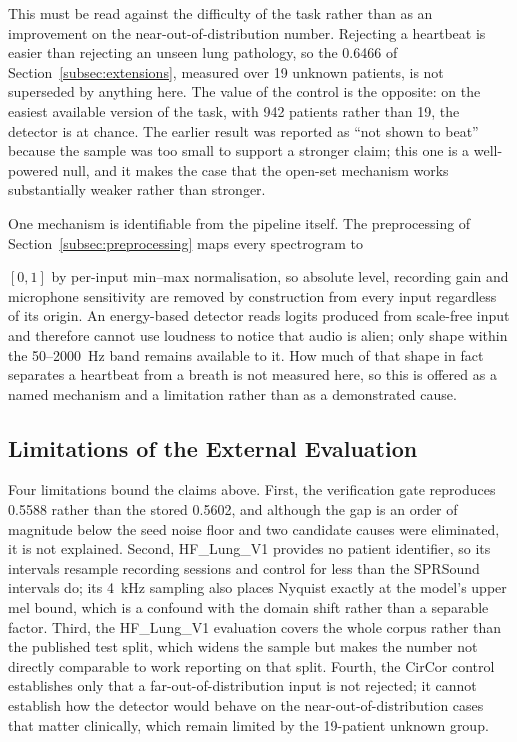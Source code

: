 \documentclass[journal,onecolumn]{IEEEtran}
\newif\ifshownew
\newcommand{\added}[1]{\ifshownew\ul{#1}\else#1\fi}
\newenvironment{addedblock}{}{}
\begin{document}
\begin{addedblock}
\added{%
This must be read against the difficulty of the task rather than as an improvement on the
near-out-of-distribution number. Rejecting a heartbeat is easier than rejecting an unseen lung
pathology, so the 0.6466 of Section~\mbox{\ref{subsec:extensions}}, measured over 19 unknown patients,
is not superseded by anything here. The value of the control is the opposite: on the easiest
available version of the task, with 942 patients rather than 19, the detector is at chance. The
earlier result was reported as ``not shown to beat'' because the sample was too small to
support a stronger claim; this one is a well-powered null, and it makes the case that the
open-set mechanism works substantially weaker rather than stronger.%
}

\added{%
One mechanism is identifiable from the pipeline itself. The preprocessing of
Section~\mbox{\ref{subsec:preprocessing}} maps every spectrogram to%
}
$[0,1]$
\added{%
by per-input min--max normalisation, so absolute level, recording gain and microphone
sensitivity are removed by construction from every input regardless of its origin. An
energy-based detector reads logits produced from scale-free input and therefore cannot use
loudness to notice that audio is alien; only shape within the 50--2000~Hz band remains
available to it. How much of that shape in fact separates a heartbeat from a breath is not
measured here, so this is offered as a named mechanism and a limitation rather than as a
demonstrated cause.%
}

\subsection{Limitations of the External Evaluation}
\label{subsec:extlimits}

\added{%
Four limitations bound the claims above. First, the verification gate reproduces 0.5588 rather
than the stored 0.5602, and although the gap is an order of magnitude below the seed noise
floor and two candidate causes were eliminated, it is not explained. Second, HF\_Lung\_V1
provides no patient identifier, so its intervals resample recording sessions and control for
less than the SPRSound intervals do; its 4~kHz sampling also places Nyquist exactly at the
model's upper mel bound, which is a confound with the domain shift rather than a separable
factor. Third, the HF\_Lung\_V1 evaluation covers the whole corpus rather than the published
test split, which widens the sample but makes the number not directly comparable to work
reporting on that split. Fourth, the CirCor control establishes only that a
far-out-of-distribution input is not rejected; it cannot establish how the detector would
behave on the near-out-of-distribution cases that matter clinically, which remain limited by
the 19-patient unknown group.%
}
\end{addedblock}
\end{document}
